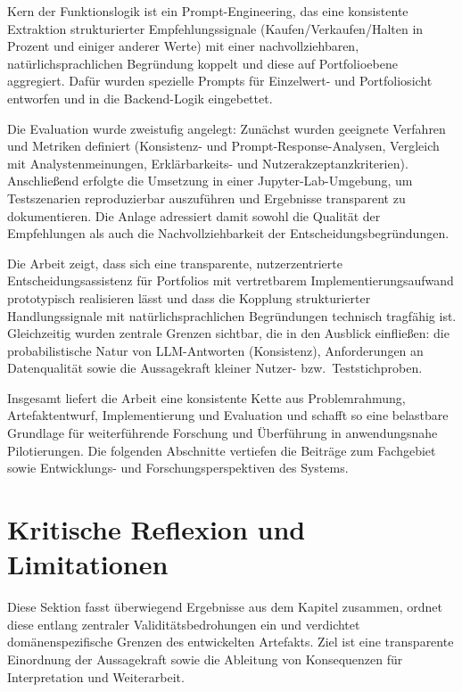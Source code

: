     Kern der Funktionslogik ist ein Prompt-Engineering, das eine konsistente Extraktion strukturierter Empfehlungssignale (Kaufen/Verkaufen/Halten in Prozent und einiger anderer Werte) mit einer nachvollziehbaren, natürlichsprachlichen Begründung koppelt und diese auf Portfolioebene aggregiert.
    Dafür wurden spezielle Prompts für Einzelwert- und Portfoliosicht entworfen und in die Backend-Logik eingebettet.

    Die Evaluation wurde zweistufig angelegt:
    Zunächst wurden geeignete Verfahren und Metriken definiert (Konsistenz- und Prompt-Response-Analysen, Vergleich mit Analystenmeinungen, Erklärbarkeits- und Nutzerakzeptanzkriterien).
    Anschließend erfolgte die Umsetzung in einer Jupyter-Lab-Umgebung, um Testszenarien reproduzierbar auszuführen und Ergebnisse transparent zu dokumentieren.
    Die Anlage adressiert damit sowohl die Qualität der Empfehlungen als auch die Nachvollziehbarkeit der Entscheidungsbegründungen.

    Die Arbeit zeigt, dass sich eine transparente, nutzerzentrierte Entscheidungsassistenz für Portfolios mit vertretbarem Implementierungsaufwand prototypisch realisieren lässt und dass die Kopplung strukturierter Handlungssignale mit natürlichsprachlichen Begründungen technisch tragfähig ist.
    Gleichzeitig wurden zentrale Grenzen sichtbar, die in den Ausblick einfließen:
    die probabilistische Natur von \acs{LLM}-Antworten (Konsistenz), Anforderungen an Datenqualität sowie die Aussagekraft kleiner Nutzer- bzw.\ Teststichproben.

    Insgesamt liefert die Arbeit eine konsistente Kette aus Problemrahmung, Artefaktentwurf, Implementierung und Evaluation und schafft so eine belastbare Grundlage für weiterführende Forschung und Überführung in anwendungsnahe Pilotierungen.
    Die folgenden Abschnitte vertiefen die Beiträge zum Fachgebiet sowie Entwicklungs- und Forschungsperspektiven des Systems.

  \section{Kritische Reflexion und Limitationen}
  \label{sec:kritische_reflexion}

    Diese Sektion fasst überwiegend Ergebnisse aus dem Kapitel  zusammen, ordnet diese entlang zentraler Validitätsbedrohungen ein und verdichtet domänenspezifische Grenzen des entwickelten Artefakts.
    Ziel ist eine transparente Einordnung der Aussagekraft sowie die Ableitung von Konsequenzen für Interpretation und Weiterarbeit.

